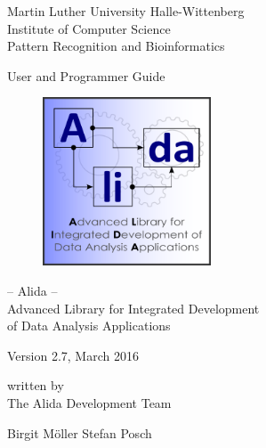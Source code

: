 
\thispagestyle{empty}

\begin{flushleft}
\large{Martin Luther University Halle-Wittenberg} \\
\normalsize{Institute of Computer Science} \\
\normalsize{Pattern Recognition and Bioinformatics}
\end{flushleft}

\vspace*{1cm}

\hrulefill

\vspace*{2cm}

\begin{center}

\large{User and Programmer Guide} \\
\vspace*{0.5cm}

  \begin{figure}[htbp]
    \centering
     \includegraphics[width = 5cm]{../images/Alida_logo.pdf}
  \end{figure}
\Large{
-- Alida -- \\ Advanced Library for Integrated Development \\ of Data Analysis Applications}

\vspace*{0.7cm}

\large{
Version 2.7, March 2016
}
\vspace*{0.5cm}

\normalsize{written by}\\
\vspace*{1.0cm}
\large{The Alida Development Team}\\
\vspace*{1.0cm}
\end{center}

\begin{center}
{\Large
       {Birgit M\"oller} \hspace*{1cm} {Stefan Posch} 
}
\end{center}

